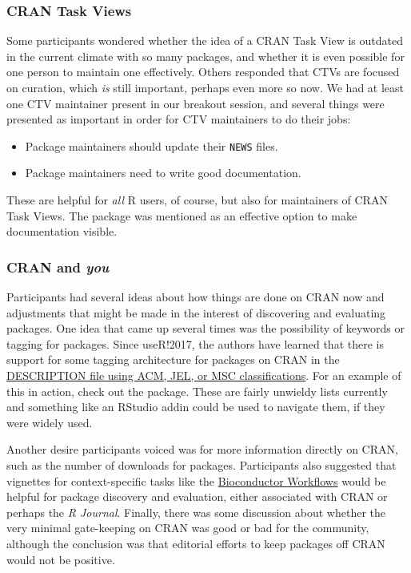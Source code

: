 \hypertarget{cran-task-views}{%
\subsubsection{CRAN Task Views}\label{cran-task-views}}

Some participants wondered whether the idea of a CRAN Task View
\citep{ctvs} is outdated in the current climate with so many packages,
and whether it is even possible for one person to maintain one
effectively. Others responded that CTVs are focused on curation, which
\emph{is} still important, perhaps even more so now. We had at least one
CTV maintainer present in our breakout session, and several things were
presented as important in order for CTV maintainers to do their jobs:

\begin{itemize}
\tightlist
\item
  Package maintainers should update their \texttt{NEWS} files.
\item
  Package maintainers need to write good documentation.
\end{itemize}

These are helpful for \emph{all} R users, of course, but also for
maintainers of CRAN Task Views. The  \citep{pkgdown}
package was mentioned as an effective option to make documentation
visible.

\hypertarget{cran-and-you}{%
\subsubsection{\texorpdfstring{CRAN and
\emph{you}}{CRAN and you}}\label{cran-and-you}}

Participants had several ideas about how things are done on CRAN now and
adjustments that might be made in the interest of discovering and
evaluating packages. One idea that came up several times was the
possibility of keywords or tagging for packages. Since useR!2017, the
authors have learned that there is support for some tagging architecture
for packages on CRAN in the
\href{https://cran.r-project.org/doc/manuals/r-release/R-exts.html\#The-DESCRIPTION-file}{DESCRIPTION
file using ACM, JEL, or MSC classifications}. For an example of this in
action, check out the  \citep{lfe} package. These are
fairly unwieldy lists currently and something like an RStudio addin
could be used to navigate them, if they were widely used.

Another desire participants voiced was for more information directly on
CRAN, such as the number of downloads for packages. Participants also
suggested that vignettes for context-specific tasks like the
\href{https://www.bioconductor.org/help/workflows/}{Bioconductor
Workflows} would be helpful for package discovery and evaluation, either
associated with CRAN or perhaps the \emph{R Journal}. Finally, there was
some discussion about whether the very minimal gate-keeping on CRAN was
good or bad for the community, although the conclusion was that
editorial efforts to keep packages off CRAN would not be positive.

